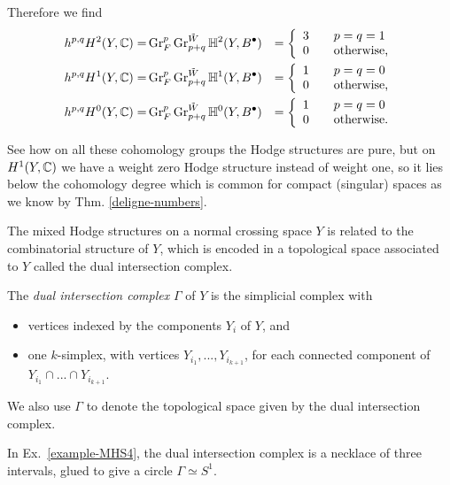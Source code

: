 \documentclass[../main.tex]{subfiles}
\begin{document}
\begin{es}
Therefore we find
\begin{eqnarray*}h^{p,q}H^2(Y,\mathbb{C}) =& \operatorname{Gr}_F^p\operatorname{Gr}^{\tilde{W}}_{p+q}\mathbb{H}^{2}(Y,B^{\bullet}) &= \left\{\begin{array}{ll} 3 &\quad p=q=1\\ 0&\quad\hbox{otherwise,}\end{array}\right.\\
h^{p,q}H^1(Y,\mathbb{C}) =& \operatorname{Gr}_F^p\operatorname{Gr}^{\tilde{W}}_{p+q}\mathbb{H}^{1}(Y,B^{\bullet}) &= \left\{\begin{array}{ll} 1 &\quad p=q=0\\ 0&\quad\hbox{otherwise,}\end{array}\right.\\
h^{p,q}H^0(Y,\mathbb{C})  =&  \operatorname{Gr}_F^p\operatorname{Gr}^{\tilde{W}}_{p+q}\mathbb{H}^{0}(Y,B^{\bullet}) &= \left\{\begin{array}{ll} 1 &\quad p=q=0\\ 0&\quad\hbox{otherwise.}\end{array}\right.
\end{eqnarray*}

See how on all these cohomology groups the Hodge structures are pure, but on $H^1(Y,\mathbb{C})$ we have a weight zero Hodge structure instead of weight one, so it lies below the cohomology degree which is common for compact (singular) spaces as we know by Thm. \ref{deligne-numbers}.

\end{es} 

The mixed Hodge structures on a normal crossing space $Y$ is related to the combinatorial structure of $Y$, which is encoded in a topological space associated to $Y$ called the dual intersection complex.

\begin{defn} 
The \emph{dual intersection complex} $\Gamma$ of $Y$ is the simplicial complex with
\begin{itemize}
\item vertices indexed by the components $Y_i$ of $Y$, and
\item one $k$-simplex, with vertices $Y_{i_1},...,Y_{i_{k+1}}$, for each connected component of $Y_{i_1}\cap...\cap Y_{i_{k+1}}$.
\end{itemize} 
We also use $\Gamma$ to denote the topological space given by the dual intersection complex.
\end{defn}

In Ex.~\ref{example-MHS4}, the dual intersection complex is a necklace of three intervals, glued to give a circle $\Gamma \simeq S^1$.
 
\end{document}
